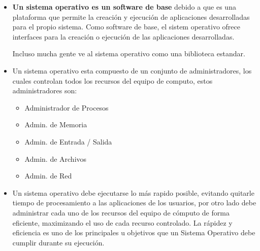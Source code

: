 \documentclass[12pt, fleqn]{report}                             %
\begin{document}
                \begin{itemize}
                    \item 
                        \textbf{Un sistema operativo es un software de base} debido a que es una plataforma que permite
                        la creación y ejecución de aplicaciones desarrolladas para el propio sistema.
                        Como software de base, el sistem operativo ofrece interfaces para la creación o ejecución
                        de las aplicaciones desarrolladas.

                        Incluso mucha gente ve al sistema operativo como una biblioteca estandar.

                    \item
                        Un sistema operativo esta compuesto de un conjunto de administradores, los cuales controlan
                        todos los recursos del equipo de computo, estos administradores son: 

                        \begin{itemize}
                            \item Administrador de Procesos
                            \item Admin. de Memoria 
                            \item Admin. de Entrada / Salida 
                            \item Admin. de Archivos 
                            \item Admin. de Red 
                        \end{itemize}

                    \item
                        Un sistema operativo debe ejecutarse lo más rapido posible, evitando quitarle tiempo de
                        procesamiento a las aplicaciones de los usuarios, por otro lado debe administrar cada uno
                        de los recursos del equipo de cómputo de forma eficiente, maximizando el uso de cada
                        recurso controlado. 
                        La rápidez y eficiencia es uno de los principales u objetivos que un Sistema Operativo debe
                        cumplir durante su ejecución.
            
                \end{itemize}
       

\end{document}
